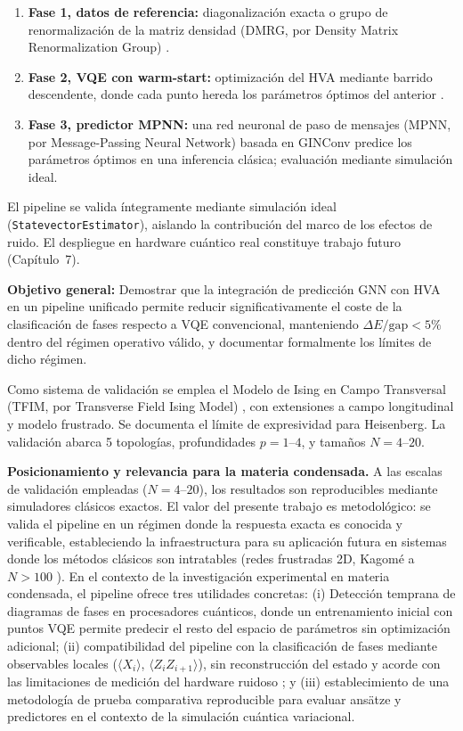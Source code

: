 \documentclass[11pt,a4paper,spanish]{book}
\begin{document}
\begin{enumerate}
    \item \textbf{Fase 1, datos de referencia:} diagonalización exacta o grupo de renormalización de la matriz densidad (DMRG, por Density Matrix Renormalization Group) \citep{schollwock2011}.
    \item \textbf{Fase 2, VQE con warm-start:} optimización del HVA mediante barrido descendente, donde cada punto hereda los parámetros óptimos del anterior \citep{puig2025, mele2022}.
    \item \textbf{Fase 3, predictor MPNN:} una red neuronal de paso de mensajes (MPNN, por Message-Passing Neural Network) basada en GINConv \citep{xu2019} predice los parámetros óptimos en una inferencia clásica; evaluación mediante simulación ideal.
\end{enumerate}

El pipeline se valida íntegramente mediante simulación ideal (\texttt{StatevectorEstimator}), aislando la contribución del marco de los efectos de ruido. El despliegue en hardware cuántico real constituye trabajo futuro (Capítulo~7).

\textbf{Objetivo general:} Demostrar que la integración de predicción GNN con HVA en un pipeline unificado permite reducir significativamente el coste de la clasificación de fases respecto a VQE convencional, manteniendo $\Delta E/\text{gap} < 5\%$ dentro del régimen operativo válido, y documentar formalmente los límites de dicho régimen.

Como sistema de validación se emplea el Modelo de Ising en Campo Transversal (TFIM, por Transverse Field Ising Model) \citep{dutta2015}, con extensiones a campo longitudinal y modelo frustrado. Se documenta el límite de expresividad para Heisenberg. La validación abarca 5 topologías, profundidades $p = 1$--$4$, y tamaños $N = 4$--$20$.

\textbf{Posicionamiento y relevancia para la materia condensada.} A las escalas de validación empleadas ($N = 4$--$20$), los resultados son reproducibles mediante simuladores clásicos exactos. El valor del presente trabajo es metodológico: se valida el pipeline en un régimen donde la respuesta exacta es conocida y verificable, estableciendo la infraestructura para su aplicación futura en sistemas donde los métodos clásicos son intratables (redes frustradas 2D, Kagomé a $N > 100$ \citep{ahsan2025}). En el contexto de la investigación experimental en materia condensada, el pipeline ofrece tres utilidades concretas: (i) Detección temprana de diagramas de fases en procesadores cuánticos, donde un entrenamiento inicial con puntos VQE permite predecir el resto del espacio de parámetros sin optimización adicional; (ii) compatibilidad del pipeline con la clasificación de fases mediante observables locales ($\langle X_i \rangle$, $\langle Z_i Z_{i+1} \rangle$), sin reconstrucción del estado y acorde con las limitaciones de medición del hardware ruidoso \citep{sharma2026}; y (iii) establecimiento de una metodología de prueba comparativa reproducible para evaluar ansätze y predictores en el contexto de la simulación cuántica variacional.
\end{document}
